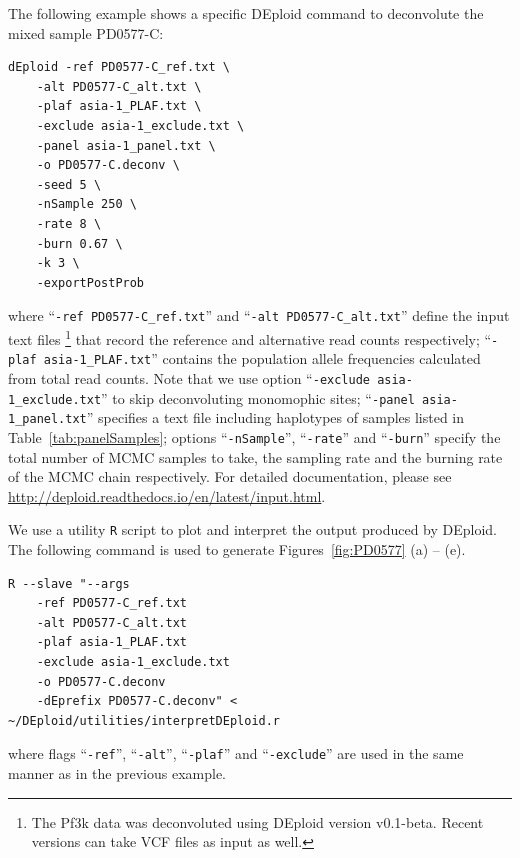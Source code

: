 \documentclass{article}
\begin{document}
The following example shows a specific {\textmd DEploid} command to deconvolute the mixed sample {\textmd PD0577-C}:
\linespread{1}
\begin{lstlisting}
dEploid -ref PD0577-C_ref.txt \
    -alt PD0577-C_alt.txt \
    -plaf asia-1_PLAF.txt \
    -exclude asia-1_exclude.txt \
    -panel asia-1_panel.txt \
    -o PD0577-C.deconv \
    -seed 5 \
    -nSample 250 \
    -rate 8 \
    -burn 0.67 \
    -k 3 \
    -exportPostProb
\end{lstlisting}
\linespread{1.5}
where ``{\tt -ref PD0577-C\_ref.txt}'' and ``{\tt -alt PD0577-C\_alt.txt}'' define the input text files \footnote{The Pf3k data was deconvoluted using DEploid version v0.1-beta. Recent versions can take VCF files as input as well.} that record the reference and alternative read counts respectively; ``{\tt -plaf asia-1\_PLAF.txt}'' contains the population allele frequencies calculated from total read counts. Note that we use option ``{\tt -exclude asia-1\_exclude.txt}'' to skip deconvoluting monomophic sites; ``{\tt -panel asia-1\_panel.txt}'' specifies a text file including haplotypes of samples listed in Table~\ref{tab:panelSamples}; options ``{\tt -nSample}'', ``{\tt -rate}'' and ``{\tt -burn}'' specify the total number of MCMC samples to take, the sampling rate and the burning rate of the MCMC chain respectively. For detailed documentation, please see \url{http://deploid.readthedocs.io/en/latest/input.html}.

We use a utility {\tt R} script to plot and interpret the output produced by DEploid. The following command is used to generate Figures~\ref{fig:PD0577} (a) -- (e).
\linespread{1}
\begin{lstlisting}
R --slave "--args
    -ref PD0577-C_ref.txt
    -alt PD0577-C_alt.txt
    -plaf asia-1_PLAF.txt
    -exclude asia-1_exclude.txt
    -o PD0577-C.deconv
    -dEprefix PD0577-C.deconv" < ~/DEploid/utilities/interpretDEploid.r
\end{lstlisting}
\linespread{1.5}
where flags ``{\tt -ref}'', ``{\tt -alt}'', ``{\tt -plaf}'' and ``{\tt -exclude}'' are used in the same manner as in the previous example.
\end{document}
